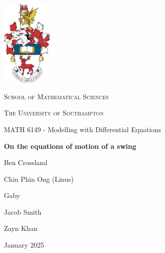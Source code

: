 \documentclass[12pt]{article}
\begin{document}


\begin{titlepage}
    \centering
    \includegraphics[width=2.5cm]{Figures/crest.jpg}\par
    \vspace{0.5cm}
    {\scshape\Large School of Mathematical Sciences \par}
    \vspace{0.25cm}
    {\scshape\Large The University of Southampton \par}
    \vspace{0.25cm}
    {\Large MATH 6149 - Modelling with Differential Equations \par}
    \vspace{1cm}
    {\huge\bfseries On the equations of motion of a swing\par}
    \vspace{1cm}
    {\Large Ben Crossland \par}
    \vspace{0.25cm}
    {\Large Chin Phin Ong (Linus) \par}
    \vspace{0.25cm}
    {\Large Gaby \par} %
    \vspace{0.25cm}
    {\Large Jacob Smith \par}
    \vspace{0.25cm}
    {\Large Zayn Khan \par}
    \vspace{0.25cm}
    {\large  \par}
    \vfill
    {\large January 2025 \par}
\end{titlepage}
\end{document}
